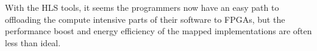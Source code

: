 With the HLS tools, it seems the programmers now have an easy path to offloading the compute intensive parts of their software
to FPGAs, but the performance boost and energy efficiency of the mapped implementations are
often less than ideal. 
